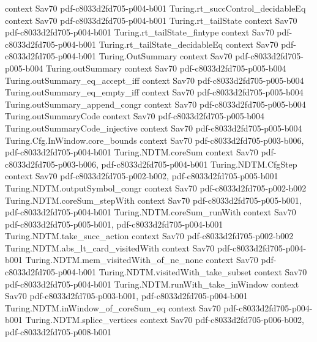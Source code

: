 \begin{theorem}
  {context}
  {Sav70}
  {pdf-c8033d2fd705-p004-b001}
\proofstep
  {Turing.rt_succControl_decidableEq}
  {context}
  {Sav70}
  {pdf-c8033d2fd705-p004-b001}
\proofstep
  {Turing.rt_tailState}
  {context}
  {Sav70}
  {pdf-c8033d2fd705-p004-b001}
\proofstep
  {Turing.rt_tailState_fintype}
  {context}
  {Sav70}
  {pdf-c8033d2fd705-p004-b001}
\proofstep
  {Turing.rt_tailState_decidableEq}
  {context}
  {Sav70}
  {pdf-c8033d2fd705-p004-b001}
\proofstep
  {Turing.OutSummary}
  {context}
  {Sav70}
  {pdf-c8033d2fd705-p005-b004}
\proofstep
  {Turing.outSummary}
  {context}
  {Sav70}
  {pdf-c8033d2fd705-p005-b004}
\proofstep
  {Turing.outSummary_eq_accept_iff}
  {context}
  {Sav70}
  {pdf-c8033d2fd705-p005-b004}
\proofstep
  {Turing.outSummary_eq_empty_iff}
  {context}
  {Sav70}
  {pdf-c8033d2fd705-p005-b004}
\proofstep
  {Turing.outSummary_append_congr}
  {context}
  {Sav70}
  {pdf-c8033d2fd705-p005-b004}
\proofstep
  {Turing.outSummaryCode}
  {context}
  {Sav70}
  {pdf-c8033d2fd705-p005-b004}
\proofstep
  {Turing.outSummaryCode_injective}
  {context}
  {Sav70}
  {pdf-c8033d2fd705-p005-b004}
\proofstep
  {Turing.Cfg.InWindow.core_bounds}
  {context}
  {Sav70}
  {pdf-c8033d2fd705-p003-b006,
    pdf-c8033d2fd705-p004-b001}
\proofstep
  {Turing.NDTM.coreSum}
  {context}
  {Sav70}
  {pdf-c8033d2fd705-p003-b006,
    pdf-c8033d2fd705-p004-b001}
\proofstep
  {Turing.NDTM.CfgStep}
  {context}
  {Sav70}
  {pdf-c8033d2fd705-p002-b002,
    pdf-c8033d2fd705-p005-b001}
\proofstep
  {Turing.NDTM.outputSymbol_congr}
  {context}
  {Sav70}
  {pdf-c8033d2fd705-p002-b002}
\proofstep
  {Turing.NDTM.coreSum_stepWith}
  {context}
  {Sav70}
  {pdf-c8033d2fd705-p005-b001,
    pdf-c8033d2fd705-p004-b001}
\proofstep
  {Turing.NDTM.coreSum_runWith}
  {context}
  {Sav70}
  {pdf-c8033d2fd705-p005-b001,
    pdf-c8033d2fd705-p004-b001}
\proofstep
  {Turing.NDTM.take_succ_action}
  {context}
  {Sav70}
  {pdf-c8033d2fd705-p002-b002}
\proofstep
  {Turing.NDTM.abs_lt_card_visitedWith}
  {context}
  {Sav70}
  {pdf-c8033d2fd705-p004-b001}
\proofstep
  {Turing.NDTM.mem_visitedWith_of_ne_none}
  {context}
  {Sav70}
  {pdf-c8033d2fd705-p004-b001}
\proofstep
  {Turing.NDTM.visitedWith_take_subset}
  {context}
  {Sav70}
  {pdf-c8033d2fd705-p004-b001}
\proofstep
  {Turing.NDTM.runWith_take_inWindow}
  {context}
  {Sav70}
  {pdf-c8033d2fd705-p003-b001,
    pdf-c8033d2fd705-p004-b001}
\proofstep
  {Turing.NDTM.inWindow_of_coreSum_eq}
  {context}
  {Sav70}
  {pdf-c8033d2fd705-p004-b001}
\proofstep
  {Turing.NDTM.splice_vertices}
  {context}
  {Sav70}
  {pdf-c8033d2fd705-p006-b002,
    pdf-c8033d2fd705-p008-b001}

\end{theorem}
